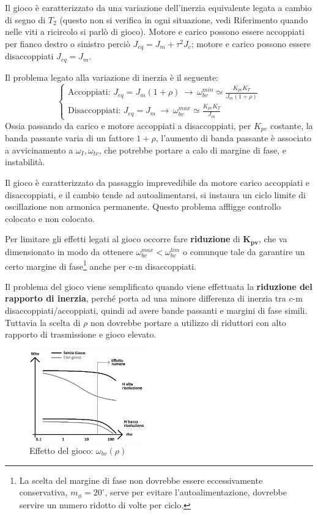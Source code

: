 Il gioco è caratterizzato da una variazione dell'inerzia equivalente legata a cambio di segno di \(T_2\) (questo non si verifica in ogni situazione, vedi {\color{red} Riferimento quando nelle viti a ricircolo si parlò di gioco}). 
Motore e carico possono essere accoppiati per fianco destro o sinistro perciò \(J_{eq} = J_m + \tau^2 J_c\); motore e carico possono essere disaccoppiati \(J_{eq} = J_m\).

Il problema legato alla variazione di inerzia è il seguente:
\[
\begin{cases}
    \text{Accoppiati: } J_{eq} = J_m (1+\rho) \ \rightarrow \ \omega_{bv}^{min} \simeq \frac{K_{pv}K_T}{J_m(1+\rho)} \\
    \text{Disaccoppiati: } J_{eq} = J_m \ \rightarrow \ \omega_{bv}^{max} \simeq \frac{K_{pv} K_T}{J_m}
\end{cases}
\]
Ossia passando da carico e motore accoppiati a disaccoppiati, per \(K_{pv}\) costante, la banda passante varia di un fattore \(1+\rho\), l'aumento di banda passante è associato a avvicinamento a \(\omega_I,\omega_{tv}\), che potrebbe portare a calo di margine di fase, e instabilità.

Il gioco è caratterizzato da passaggio imprevedibile da motore carico accoppiati e disaccoppiati, e il cambio tende ad autoalimentarsi, si instaura un ciclo limite di oscillazione non armonica permanente.
Questo problema affligge controllo colocato e non colocato.

Per limitare gli effetti legati al gioco occorre fare \textbf{riduzione} di \(\mathbf{K_{pv}}\), che va dimensionato in modo da ottenere \(\omega_{bv}^{max} < \omega_{bv}^{lim}\) o comunque tale da garantire un certo margine di fase\footnote{La scelta del margine di fase non dovrebbe essere eccessivamente conservativa, \(m_\phi = 20^\circ\), serve per evitare l'autoalimentazione, dovrebbe servire un numero ridotto di volte per ciclo.} anche per c-m disaccoppiati.

Il problema del gioco viene semplificato quando viene effettuata la \textbf{riduzione del rapporto di inerzia}, perché porta ad una minore differenza di inerzia tra c-m disaccoppiati/accoppiati, quindi ad avere bande passanti e margini di fase simili.
Tuttavia la scelta di \(\rho\) non dovrebbe portare a utilizzo di riduttori con alto rapporto di trasmissione e gioco elevato.

\begin{figure}[h]
    \centering
    \includegraphics[width=0.45\textwidth]{Immagini/gioco_banda_passante_rho.png}
    \caption{Effetto del gioco: \(\omega_{bv}(\rho)\)}
\end{figure}

